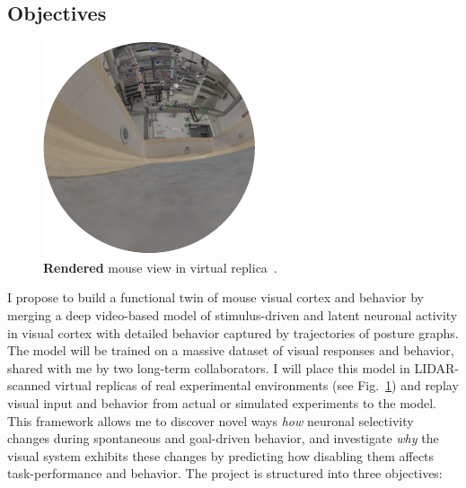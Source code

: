 \documentclass[COG,11pt]{ercgrant}
\begin{document}
\subsection{Objectives}
\begin{figure}
\vspace{-4ex}
\includegraphics[width=\linewidth]{figures/rendered.pdf}
\caption{\textbf{Rendered} mouse view in virtual replica~\parencite[from][]{Holmgren2021-jv}.}
\label{fig:replica}
\end{figure}
I propose to build a functional twin of mouse visual cortex and behavior by merging a deep video-based model of stimulus-driven and latent neuronal activity in visual cortex with detailed behavior captured by trajectories of posture graphs. The model will be trained on a massive dataset of visual responses and behavior, shared with me by two long-term collaborators. I will place this model in LIDAR-scanned virtual replicas of real experimental environments (see Fig.~\ref{fig:replica}) and replay visual input and behavior from actual or simulated experiments to the model.
This framework allows me to discover novel ways \textit{how} neuronal selectivity  changes during spontaneous and goal-driven behavior, and investigate \textit{why} the visual system exhibits these changes by predicting how disabling them affects task-performance and behavior. The project is structured into three objectives:
\end{document}
